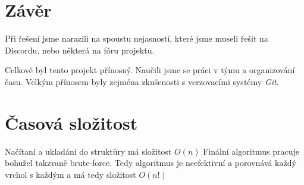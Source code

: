 
\section{Závěr}
Při řešení jsme narazili na spoustu nejasností, které jsme museli řešit na Discordu, nebo některá na fóru projektu.

Celkově byl tento projekt přínosný. Naučili jsme se práci v týmu a organizování času.
Velkým přínosem byly zejména zkušenosti s verzovacími systémy \textit{Git}.

\section{Časová složitost}
Načítaní a ukladání do struktůry má složitost $O(n)$
Finální algoritmus pracuje bohužel takzvaně brute-force. Tedy algoritmus je neefektivní a porovnává každý vrchol s
každým a má tedy složitost $O(n!)$
\newpage